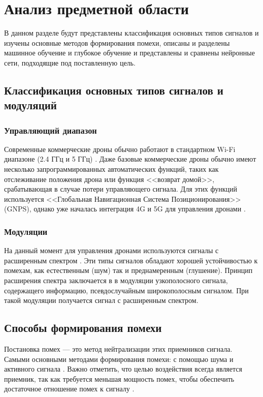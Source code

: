 \chapter{Анализ предметной области}

В данном разделе будут представлены классификация основных типов сигналов и изучены основные методов формирования помехи, описаны и разделены машинное обучение и глубокое обучение и представлены и сравнены нейронные сети, подходящие под поставленную цель.

\section{Классификация основных типов сигналов и модуляций}

\subsection{Управляющий диапазон}
Современные коммерческие дроны обычно работают в стандартном Wi-Fi диапазоне (2.4 ГГц и 5 ГГц) \cite{wifidiapazon}. Даже базовые коммерческие дроны обычно имеют несколько запрограммированных автоматических функций, таких как отслеживание положения дрона или функция <<возврат домой>>, срабатывающая в случае потери управляющего сигнала. Для этих функций используется <<Глобальная Навигационная Система Позиционирования>> (GNPS), однако уже началась интеграция 4G и 5G для управления дронами \cite{4gand5g}.

\subsection{Модуляции}

На данный момент для управления дронами используются сигналы с расширенным спектром \cite{spreadspecsignals}. Эти типы сигналов обладают хорошей устойчивостью к помехам, как естественным (шум) так и преднамеренным (глушение). Принцип расширения спектра заключается в в модуляции \cite{signalmodulation} узкополосного сигнала, содержащего информацию, псевдослучайным широкополосным сигналом. При такой модуляции получается сигнал с расширенным спектром.

\section{Способы формирования помехи}

Постановка помех --- это метод нейтрализации этих приемников сигнала. Самыми основными методами формирования помехи: с помощью шума и активного сигнала \cite{radioelecpomeh}. Важно отметить, что целью воздействия всегда является приемник, так как требуется меньшая мощность помех, чтобы обеспечить достаточное отношение помех к сигналу \cite{signaltointer}.

